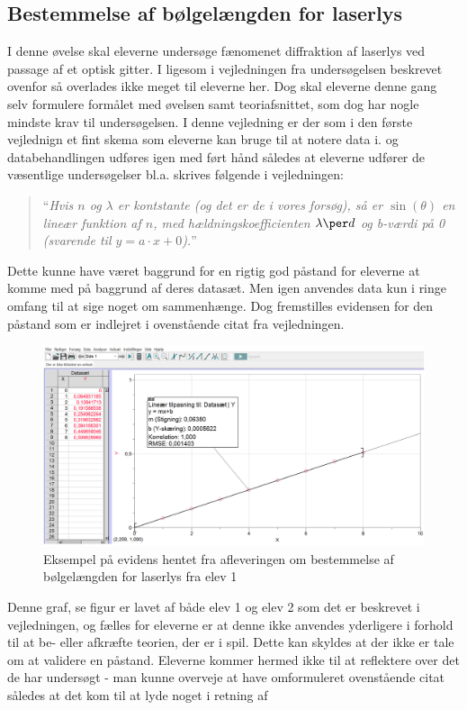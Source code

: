 \subsection*{Bestemmelse af bølgelængden for laserlys}
I denne øvelse skal eleverne undersøge fænomenet diffraktion af laserlys ved passage af et optisk gitter. I ligesom i vejledningen fra undersøgelsen beskrevet ovenfor så overlades ikke meget til eleverne her. Dog skal eleverne denne gang selv formulere formålet med øvelsen  samt teoriafsnittet, som dog har nogle mindste krav til undersøgelsen. I denne vejledning er der som i den første vejlednign et fint skema som eleverne kan bruge til at notere data i. og databehandlingen udføres igen med ført hånd således at eleverne udfører de væsentlige undersøgelser bl.a. skrives følgende i vejledningen:
\begin{quote}
	``\emph{Hvis $n$ og $\lambda$ er kontstante (og det er de i vores forsøg), så er $\sin(\theta)$ en lineær funktion af $n$, med hældningskoefficienten $\lambda\per d$ og b-værdi på 0 (svarende til $y = a\cdot x + 0$).}''
\end{quote}
Dette kunne have været baggrund for en rigtig god påstand for eleverne at komme med på baggrund af deres datasæt. Men igen anvendes data kun i ringe omfang til at sige noget om sammenhænge. Dog fremstilles evidensen for den påstand som er indlejret i ovenstående citat fra vejledningen. 
\begin{figure}[h!]
	\centering
	\includegraphics[width=\textwidth]{Figs/EviHan}
	\caption{Eksempel på evidens hentet fra afleveringen om bestemmelse af bølgelængden for laserlys fra elev 1}
	\label{fig:elev1}
\end{figure}
Denne graf, se figur  er lavet af både elev 1 og elev 2 som det er beskrevet i vejledningen, og fælles for eleverne er at denne ikke anvendes yderligere i forhold til at be- eller afkræfte teorien, der er i spil. Dette kan skyldes at der ikke er tale om at validere en påstand. Eleverne kommer hermed ikke til at reflektere over det de har undersøgt - man kunne overveje at have omformuleret ovenstående citat således at det kom til at lyde noget i retning af 
